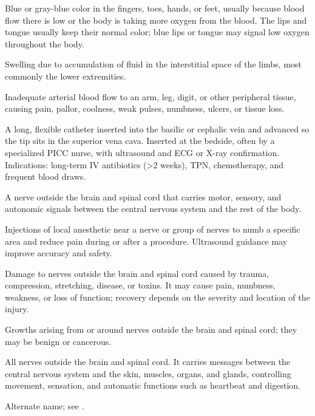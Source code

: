  Blue or gray-blue color in the fingers, toes, hands, or feet, usually because blood flow there is low or the body is taking more oxygen from the blood. The lips and tongue usually keep their normal color; blue lips or tongue may signal low oxygen throughout the body.

 Swelling due to accumulation of fluid in the interstitial space of the limbs, most
commonly the lower extremities.

 Inadequate arterial blood flow to an arm, leg, digit, or other peripheral tissue, causing pain, pallor, coolness, weak pulses, numbness, ulcers, or tissue loss.

 A long, flexible catheter inserted into the basilic or cephalic vein and advanced so the
tip sits in the superior vena cava. Inserted at the bedside, often by a specialized PICC
nurse, with ultrasound and ECG or X-ray confirmation. Indications: long-term IV
antibiotics (>2 weeks), TPN, chemotherapy, and frequent blood draws.

 A nerve outside the brain and spinal cord that carries motor, sensory, and autonomic signals between the central nervous system and the rest of the body.

 Injections of local anesthetic near a nerve or group of nerves to numb a specific area and reduce pain during or after a procedure. Ultrasound guidance may improve accuracy and safety.

 Damage to nerves outside the brain and spinal cord caused by trauma, compression, stretching, disease, or toxins.
It may cause pain, numbness, weakness, or loss of function; recovery depends on the
severity and location of the injury.

 Growths arising from or around nerves outside the brain and spinal cord; they may be benign or cancerous.

 All nerves outside the brain and spinal cord. It carries messages between the central nervous system and the skin, muscles, organs, and glands, controlling movement, sensation, and automatic functions such as heartbeat and digestion.

 Alternate name; see .

